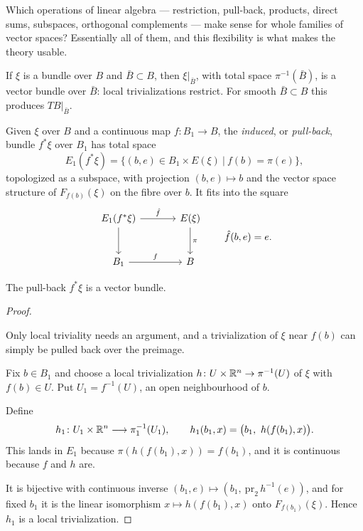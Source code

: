 \begin{guiding}
Which operations of linear algebra --- restriction, pull-back, products, direct
sums, subspaces, orthogonal complements --- make sense for whole families of
vector spaces? Essentially all of them, and this flexibility is what makes the
theory usable.
\end{guiding}

\begin{construction}[Restriction]
If $\xi$ is a bundle over $B$ and $\bar B\subset B$, then $\xi|_{\bar B}$, with
total space $\pi^{-1}(\bar B)$, is a vector bundle over $\bar B$: local
trivializations restrict. For smooth $\bar B\subset B$ this produces
$TB|_{\bar B}$.
\end{construction}

\begin{construction}\label{con:pullback}
Given $\xi$ over $B$ and a continuous map $f\colon B_1\to B$, the
\emph{induced}, or \emph{pull-back}, bundle $f^*\xi$ over $B_1$ has total space
\[
E_1(f^*\xi)=\big\{(b,e)\in B_1\times E(\xi)\ \big|\ f(b)=\pi(e)\big\},
\]
topologized as a subspace, with projection $(b,e)\mapsto b$ and the vector space
structure of $F_{f(b)}(\xi)$ on the fibre over $b$. It fits into the square
\[
\begin{tikzcd}[row sep=large, column sep=large]
E_1(f^*\xi) \arrow[r,"\hat f"] \arrow[d] & E(\xi) \arrow[d,"\pi"] \\
B_1 \arrow[r,"f"] & B
\end{tikzcd}
\qquad
\hat f(b,e)=e .
\]
\end{construction}

\begin{proposition}
The pull-back $f^*\xi$ is a vector bundle.
\end{proposition}

\begin{proof}
\begin{strategy}
Only local triviality needs an argument, and a trivialization of $\xi$ near
$f(b)$ can simply be pulled back over the preimage.
\end{strategy}

 Fix $b\in B_1$ and choose a local trivialization
$h\colon U\times\mathbb{R}^n\to\pi^{-1}(U)$ of $\xi$ with $f(b)\in U$. Put
$U_1=f^{-1}(U)$, an open neighbourhood of $b$.

 Define
\[
h_1\colon U_1\times\mathbb{R}^n\longrightarrow \pi_1^{-1}(U_1),
\qquad
h_1(b_1,x)=\big(b_1,\ h(f(b_1),x)\big).
\]
This lands in $E_1$ because $\pi(h(f(b_1),x))=f(b_1)$, and it is continuous
because $f$ and $h$ are.

 It is bijective with continuous inverse
$(b_1,e)\mapsto(b_1,\ \mathrm{pr}_2\,h^{-1}(e))$, and for fixed $b_1$ it is the
linear isomorphism $x\mapsto h(f(b_1),x)$ onto $F_{f(b_1)}(\xi)$. Hence $h_1$ is
a local trivialization.
\end{proof}

